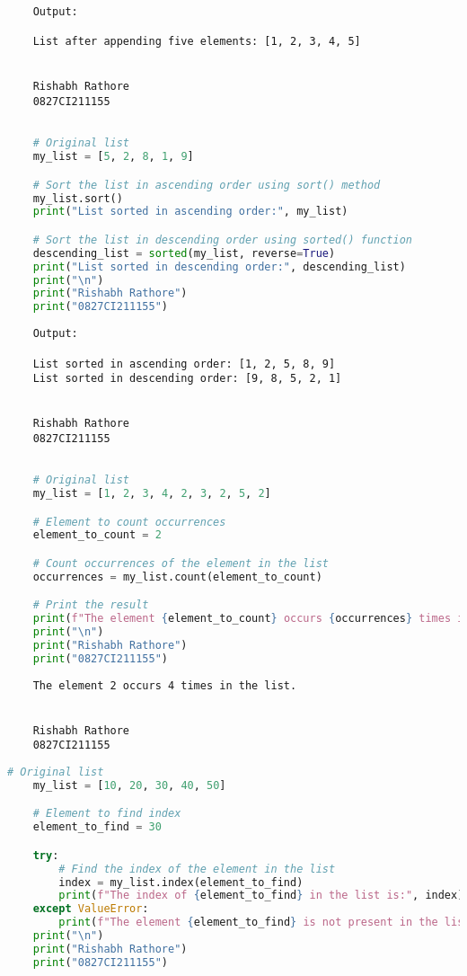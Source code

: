 \documentclass{report}
\begin{document}
\begin{verbatim}
	Output:

	List after appending five elements: [1, 2, 3, 4, 5]


	Rishabh Rathore
	0827CI211155
\end{verbatim}
\newpage


\sol{}
\begin{lstlisting}[language=Python]

	# Original list
	my_list = [5, 2, 8, 1, 9]

	# Sort the list in ascending order using sort() method
	my_list.sort()
	print("List sorted in ascending order:", my_list)

	# Sort the list in descending order using sorted() function
	descending_list = sorted(my_list, reverse=True)
	print("List sorted in descending order:", descending_list)
	print("\n")
	print("Rishabh Rathore")
	print("0827CI211155")
\end{lstlisting}

\begin{verbatim}
	Output:

	List sorted in ascending order: [1, 2, 5, 8, 9]
	List sorted in descending order: [9, 8, 5, 2, 1]
	
	
	Rishabh Rathore
	0827CI211155
\end{verbatim}
\newpage


\sol{}
\begin{lstlisting}[language=Python]

	# Original list
	my_list = [1, 2, 3, 4, 2, 3, 2, 5, 2]

	# Element to count occurrences
	element_to_count = 2

	# Count occurrences of the element in the list
	occurrences = my_list.count(element_to_count)

	# Print the result
	print(f"The element {element_to_count} occurs {occurrences} times in the list.")
	print("\n")
	print("Rishabh Rathore")
	print("0827CI211155")
\end{lstlisting}

\begin{verbatim}
	The element 2 occurs 4 times in the list.


	Rishabh Rathore
	0827CI211155
\end{verbatim}
\newpage


\sol{}
\begin{lstlisting}[language=Python]
	# Original list
	my_list = [10, 20, 30, 40, 50]

	# Element to find index
	element_to_find = 30

	try:
		# Find the index of the element in the list
		index = my_list.index(element_to_find)
		print(f"The index of {element_to_find} in the list is:", index)
	except ValueError:
		print(f"The element {element_to_find} is not present in the list.")
	print("\n")
	print("Rishabh Rathore")
	print("0827CI211155")
\end{lstlisting}
\end{document}
